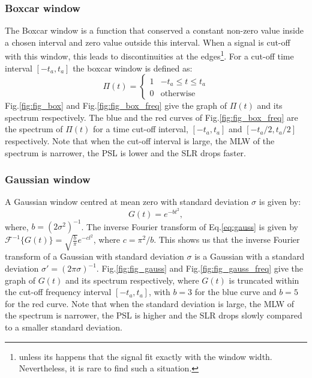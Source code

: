 \documentclass[useAMS,usenatbib]{mn2e}
\begin{document}
\subsubsection{Boxcar window}
The Boxcar window is a function that  conserved a constant non-zero value  inside a chosen  interval and zero value outside this interval.
When a signal is cut-off with this window, this leads to discontinuities at the edges\footnote{unless its 
happens that the signal  fit exactly with the window width. Nevertheless, it is rare to find such a situation.}. For 
a cut-off time interval  $[-t_a,t_a]$ the boxcar window is defined as:
\begin{equation}
\Pi(t)=\left\{
\begin{array}{rl}
1 & \mbox{$-t_a \leq t \leq t_a$} \\
0 & \mbox{otherwise}
\end{array}\right.
\end{equation}
Fig.\ref{fig:fig_box} and Fig.\ref{fig:fig_box_freq} give the graph of $\Pi(t)$ and its spectrum respectively. The blue and 
the red curves of Fig.\ref{fig:fig_box_freq} are the spectrum of $\Pi(t)$ for a time cut-off interval, $[-t_a, t_a]$ and 
$[-t_a/2,t_a/2]$ respectively. Note that when the cut-off interval is large, the MLW of the spectrum is 
narrower, the PSL is lower and the SLR drops faster.
\subsubsection{Gaussian window}
A Gaussian window centred at mean zero with standard deviation $\sigma$ is given by: 
\begin{equation}
  G(t)= e^{-bt^{2}}, \label{eq:gauss}
\end{equation}
where, $b=(2\sigma^2)^{-1}$. The inverse Fourier transform of Eq.\ref{eq:gauss} is given by 
$\mathcal{F}^{-1}\big\{G(t)\big\}=\sqrt{\frac{b}{\pi}}e^{-cl^2}$, where $c=\pi^2/b$.
This shows us that the inverse Fourier transform of a Gaussian with standard deviation $\sigma$ is a Gaussian with a standard 
deviation $\sigma '= (2\pi\sigma)^{-1}$.
Fig.\ref{fig:fig_gauss} and Fig.\ref{fig:fig_gauss_freq} give the graph of $G(t)$ and its spectrum respectively, where $G(t)$ 
is truncated within the cut-off frequency interval $[-t_a,t_a]$, with $b = 3$ for the blue curve and $b=5$ for the red curve. Note 
that when the standard deviation is large, the MLW of the spectrum is narrower, the PSL is higher and the SLR drops slowly compared to a 
smaller standard deviation.
\end{document}

